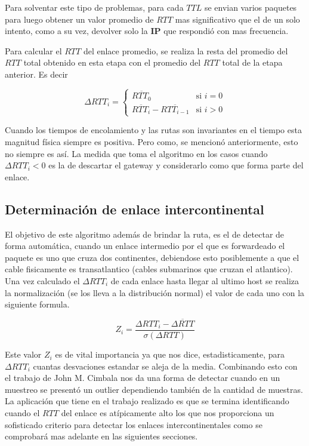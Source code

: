 Para solventar este tipo de problemas, para cada $TTL$ se envian varios paquetes
para luego obtener un valor promedio de $RTT$ mas significativo que el de un
solo intento, como a su vez, devolver solo la \textbf{IP} que respondió con mas
frecuencia.

Para calcular el $RTT$ del enlace promedio, se realiza la resta
del promedio del $RTT$ total obtenido en esta etapa con el promedio del $RTT$ total
de la etapa anterior.
Es decir

\begin{equation}
	\Delta RTT_{i} = \left\{
		\begin{array}{cl}
			\overline{RTT_{0}} & \mbox{si } i = 0\\
			\overline{RTT_{i}} - \overline{RTT_{i-1}} & \mbox{si } i > 0
		\end{array}
		\right.
\end{equation}

Cuando los tiempos de encolamiento y las rutas son invariantes en el tiempo
esta magnitud física siempre es positiva. Pero como, se mencionó anteriormente, esto
no siempre es así. La medida que toma el algoritmo en los casos cuando
$\Delta RTT_{i} < 0$ es la de descartar el
gateway y considerarlo como que forma parte del enlace.

\subsection{Determinación de enlace intercontinental}

El objetivo de este algoritmo además de brindar la ruta, es el de detectar de
forma automática, cuando un enlace intermedio por el que es forwardeado el
paquete es uno que cruza dos continentes, debiendose esto posiblemente a
que el cable fisicamente es transatlantico (cables submarinos que cruzan el
atlantico). Una vez calculado el $\Delta RTT_{i}$ de cada enlace hasta llegar
al ultimo host se realiza la normalización (se los lleva a la distribución normal)
el valor de cada uno con la siguiente formula.

\begin{equation}
	Z_{i} = \frac{\Delta RTT_{i} - \overline{\Delta RTT}}{\sigma \left(\Delta RTT \right)}
\end{equation}

Este valor $Z_{i}$ es de vital importancia ya que nos dice, estadisticamente,
para $\Delta RTT_{i}$ cuantas desvaciones estandar se aleja de la media.
Combinando esto con el trabajo de John M. Cimbala\cite{cimbala} nos da una forma de
detectar cuando en un muestreo se presentó un outlier dependiendo también de la
cantidad de muestras. La aplicación que tiene en el trabajo realizado es que se
termina identificando cuando el $RTT$ del enlace es atípicamente alto los que nos
proporciona un sofisticado criterio para detectar los enlaces
intercontinentales como se comprobará mas adelante en las siguientes secciones.
